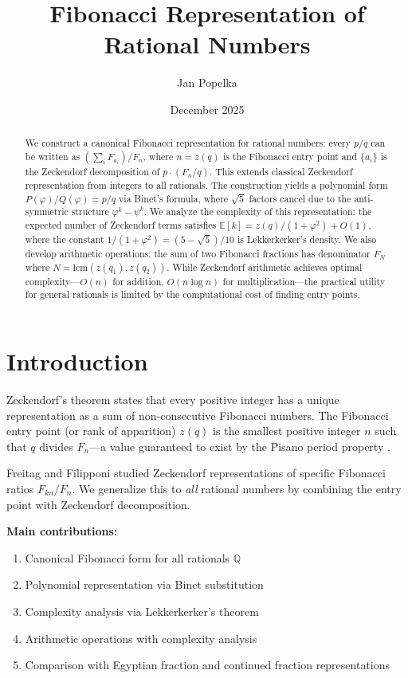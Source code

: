 \documentclass[11pt]{article}
\title{Fibonacci Representation of Rational Numbers}
\author{Jan Popelka}
\date{December 2025}
\begin{document}
\maketitle

\begin{abstract}
We construct a canonical Fibonacci representation for rational numbers: every $p/q$ can be written as $(\sum_i F_{a_i})/F_n$, where $n = z(q)$ is the Fibonacci entry point and $\{a_i\}$ is the Zeckendorf decomposition of $p \cdot (F_n/q)$. This extends classical Zeckendorf representation from integers to all rationals. The construction yields a polynomial form $P(\varphi)/Q(\varphi) = p/q$ via Binet's formula, where $\sqrt{5}$ factors cancel due to the anti-symmetric structure $\varphi^k - \psi^k$. We analyze the complexity of this representation: the expected number of Zeckendorf terms satisfies $\mathbb{E}[k] = z(q)/(1+\varphi^2) + O(1)$, where the constant $1/(1+\varphi^2) = (5-\sqrt{5})/10$ is Lekkerkerker's density. We also develop arithmetic operations: the sum of two Fibonacci fractions has denominator $F_N$ where $N = \mathrm{lcm}(z(q_1), z(q_2))$. While Zeckendorf arithmetic achieves optimal complexity---$O(n)$ for addition, $O(n \log n)$ for multiplication---the practical utility for general rationals is limited by the computational cost of finding entry points.
\end{abstract}

\section{Introduction}

Zeckendorf's theorem \cite{zeckendorf1972} states that every positive integer has a unique representation as a sum of non-consecutive Fibonacci numbers. The Fibonacci entry point (or rank of apparition) $z(q)$ is the smallest positive integer $n$ such that $q$ divides $F_n$---a value guaranteed to exist by the Pisano period property \cite{OEIS-A001175}.

Freitag and Filipponi \cite{freitag1990,filipponi1993} studied Zeckendorf representations of specific Fibonacci ratios $F_{kn}/F_n$. We generalize this to \emph{all} rational numbers by combining the entry point with Zeckendorf decomposition.

\textbf{Main contributions:}
\begin{enumerate}
    \item Canonical Fibonacci form for all rationals $\mathbb{Q}$
    \item Polynomial representation via Binet substitution
    \item Complexity analysis via Lekkerkerker's theorem
    \item Arithmetic operations with complexity analysis
    \item Comparison with Egyptian fraction and continued fraction representations
\end{enumerate}
\end{document}
